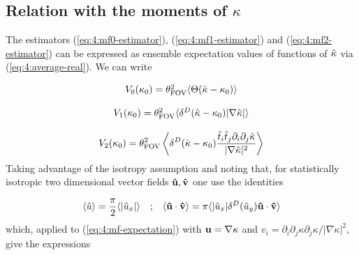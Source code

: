 \subsection{Relation with the moments of $\kappa$}
The estimators (\ref{eq:4:mf0-estimator}), (\ref{eq:4:mf1-estimator}) and (\ref{eq:4:mf2-estimator}) can be expressed as ensemble expectation values of functions of $\hat{\kappa}$ via (\ref{eq:4:average-real}). We can write

\begin{equation}
\label{eq:4:mf-expectation}
\begin{matrix}
V_0(\kappa_0) = \theta_{\rm FOV}^2\langle\Theta(\hat{\kappa}-\kappa_0)\rangle \\ \\
V_1(\kappa_0) = \theta_{\rm FOV}^2\langle\delta^D(\hat{\kappa}-\kappa_0)\vert\nabla\hat{\kappa}\vert\rangle \\ \\
\displaystyle V_2(\kappa_0) = \theta_{\rm FOV}^2\left\langle\delta^D(\hat{\kappa}-\kappa_0)\frac{\hat{t}_i\hat{t}_j\partial_i\partial_j\hat{\kappa}}{\vert\nabla\hat{\kappa}\vert^2}\right\rangle
\end{matrix}
\end{equation}
%
Taking advantage of the isotropy assumption and noting that, for statistically isotropic two dimensional vector fields $\mathbf{\hat{u}},\mathbf{\hat{v}}$ one use the identities

\begin{equation}
\label{eq:4:iso-vectors}
\begin{matrix}
\displaystyle \langle\hat{u}\rangle = \frac{\pi}{2}\langle\vert\hat{u}_x\vert\rangle & ; & \displaystyle \langle\mathbf{\hat{u}}\cdot\mathbf{\hat{v}}\rangle = \pi\langle\vert \hat{u}_x\vert\delta^D (\hat{u}_y)\mathbf{\hat{u}}\cdot\mathbf{\hat{v}}\rangle
\end{matrix}
\end{equation}
%
which, applied to (\ref{eq:4:mf-expectation}) with $\mathbf{u}=\nabla\kappa$ and $v_i=\partial_i\partial_j\kappa\partial_j\kappa/\vert\nabla\kappa\vert^2$, give the expressions

